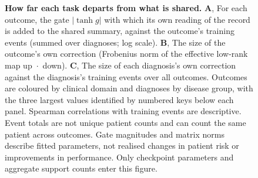 
\begin{figure}[p]
  \caption{\textbf{How far each task departs from what is shared.}
  \textbf{A}, For each outcome, the gate $|\tanh g|$ with which its own reading
  of the record is added to the shared summary, against the outcome's training
  events (summed over diagnoses; log scale). \textbf{B}, The size of the
  outcome's own correction (Frobenius norm of the effective low-rank map
  up~$\cdot$~down). \textbf{C}, The size of each diagnosis's own correction
  against the diagnosis's training events over all outcomes. Outcomes are
  coloured by clinical domain and diagnoses by disease group, with the three largest
  values identified by numbered keys below each panel. Spearman correlations
  with training events are descriptive. Event totals are not unique patient
  counts and can count the same patient across outcomes. Gate magnitudes and
  matrix norms describe fitted parameters, not realised changes in patient
  risk or improvements in performance. Only checkpoint parameters and aggregate
  support counts enter this figure.}
  \label{fig:supp-specialisation}
\end{figure}

